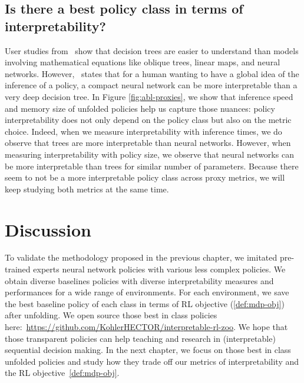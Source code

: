 \subsection{Is there a best policy class in terms of interpretability?}
User studies from~\cite{study-1,study-2,study-3} show that decision trees are easier to understand than models involving mathematical equations like oblique trees, linear maps, and neural networks.
However,~\cite{mythos} states that for a human wanting to have a global idea of the inference of a policy, a compact neural network can be more interpretable than a very deep decision tree.
In Figure \ref{fig:abl-proxies}, we show that inference speed and memory size of unfolded policies help us capture those nuances: policy interpretability does not only depend on the policy class but also on the metric choice.
Indeed, when we measure interpretability with inference times, we do observe that trees are more interpretable than neural networks.
However, when measuring interpretability with policy size, we observe that neural networks can be more interpretable than trees for similar number of parameters.
Because there seem to not be a more interpretable policy class across proxy metrics, we will keep studying both metrics at the same time.

\section{Discussion}
To validate the methodology proposed in the previous chapter, we imitated pre-trained experts neural network policies with various less complex policies.
We obtain diverse baselines policies with diverse interpretability measures and performances for a wide range of environments.
For each environment, we save the best baseline policy of each class in terms of RL objective (\ref{def:mdp-obj}) after unfolding.
We open source those best in class policies here:~\url{https://github.com/KohlerHECTOR/interpretable-rl-zoo}.
We hope that those transparent policies can help teaching and research in (interpretable) sequential decision making.
In the next chapter, we focus on those best in class unfolded policies and study how they trade off our metrics of interpretability and the RL objective~\ref{def:mdp-obj}.
